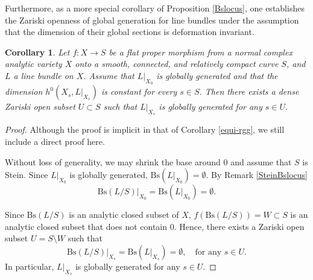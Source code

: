 \documentclass[12pt]{amsart}
\numberwithin{equation}{section}
\newtheorem{corollary}  [theorem]     {Corollary}
\theoremstyle{definition}
\newtheorem{example}  [theorem]     {Example}
\theoremstyle{plain}
\newtheorem*{thm A*}{Theorem A}
\newtheorem*{thm B*}{Theorem B}
\newtheorem*{thm C*}{Theorem C}
\newtheorem*{thm D*}{Theorem D}
\theoremstyle{definition}
\renewcommand{\1}{\mathds{1}}
\renewcommand{\>}{\rightarrow}
\begin{document}
Furthermore, as a more special corollary of Proposition \ref{Bslocus}, one establishes the Zariski openness of global generation for line bundles under the assumption that the dimension of their global sections is deformation invariant.
\begin{corollary}\label{opensemiample}
Let $ f: X \to S $ be a flat proper morphism from a normal complex analytic variety $ X $ onto a smooth, connected, and relatively compact curve $S$, and  $ L $ a line bundle on $ X $. Assume that $ L|_{X_0} $ is globally generated and that the dimension $ h^0(X_s, L|_{X_s}) $ is constant for every $ s \in S $. Then there exists a dense Zariski open subset $ U \subset S $ such that $ L|_{X_s} $ is globally generated for any $ s \in U $.
\end{corollary} 
\begin{proof} Although the proof is implicit in that of Corollary \ref{equi-rgg}, we still include a direct proof here. 

Without loss of generality, we may shrink the base around $0$ and assume that $S$ is Stein. Since $L|_{X_0}$ is globally generated, $\text{Bs}(L|_{X_0}) = \emptyset$. By Remark \ref{SteinBslocus}  $$\mathrm{Bs}(L/S)|_{X_0} = \mathrm{Bs}(L|_{X_0}) = \emptyset.$$

Since $\mathrm{Bs}(L/S)$ is an analytic closed subset of $X$, $f(\mathrm{Bs}(L/S)) = W\subset S$ is an analytic closed subset that does not contain $0$. Hence, there exists a Zariski open subset $U = S \setminus W$ such that $$\mathrm{Bs}(L /S)|_{X_s} = \mathrm{Bs}(L|_{X_s}) = \emptyset ,\quad \text{for any } s \in U.$$In particular, $L|_{X_s}$ is globally generated for any $s\in U$.
\end{proof}
\end{document}
